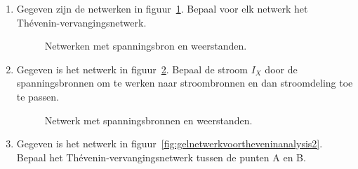 \begin{enumerate}[labelindent=0pt,labelwidth=\widthof{8.88.\ },label=\textbf{\thechapter.\arabic*.},leftmargin=!,ref=\thechapter.\arabic*]
\item
\label{que:gelthevenin1}
Gegeven zijn de netwerken in figuur~\ref{fig:gelnetwerkvoortheveninanalysis1}. Bepaal voor elk netwerk het Thévenin-vervangingsnetwerk.


\begin{figure}[!ht]
\centering
{}
\caption{Netwerken met spanningsbron en weerstanden.}
\label{fig:gelnetwerkvoortheveninanalysis1}
\end{figure}


\item
\label{que:gelthevenin5}
Gegeven is het netwerk in figuur~\ref{fig:gelthevenin3}. Bepaal de stroom $I_X$ door de spanningsbronnen om te werken naar stroombronnen en dan stroomdeling toe te passen.

\begin{figure}[!ht]
\centering
{}
\caption{Netwerk met spanningsbronnen en weerstanden.}
\label{fig:gelthevenin3}
\end{figure}


\item
\label{que:gelthevenin2}
Gegeven is het netwerk in figuur~\ref{fig:gelnetwerkvoortheveninanalysis2}. Bepaal het Thévenin-vervangingsnetwerk tussen de punten A en B. 


\end{enumerate}
